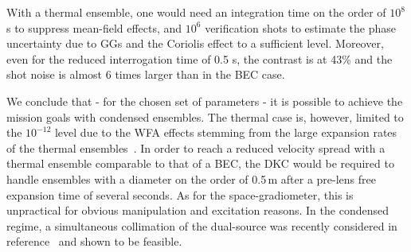 With a thermal ensemble, one would need an integration time on the order of $10^8$ s to suppress mean-field effects, and $10^6$ verification shots to estimate the phase uncertainty due to GGs and the Coriolis effect to a sufficient level. Moreover, even for the reduced interrogation time of 0.5 s, the contrast is at 43\% and the shot noise is almost 6 times larger than in the BEC case.

We conclude that - for the chosen set of parameters - it is possible to achieve the mission goals with condensed ensembles. The thermal case is, however, limited to the $10^{-12}$ level due to the WFA effects stemming from the large expansion rates of the thermal ensembles~\cite{Karcher2018}. In order to reach a reduced velocity spread with a thermal ensemble comparable to that of a BEC, the DKC would be required to handle ensembles with a diameter on the order of 0.5\,m after a pre-lens free expansion time of several seconds. As for the space-gradiometer, this is unpractical for obvious manipulation and excitation reasons. In the condensed regime, a simultaneous collimation of the dual-source was recently considered in reference~\cite{Corgier2020} and shown to be feasible.
%